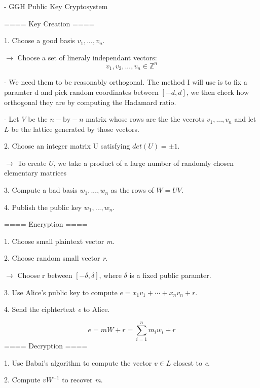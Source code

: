 \documentclass{article}
\begin{document}
- GGH Public Key Cryptosystem\newline

	==== Key Creation ====\newline

1. Choose a good basis $v_1, \text{...}, v_n$.

$\rightarrow$ Choose a set of lineraly independant vectors:
$$v_1, v_2, \text{...}, v_n \in \mathbb{Z}^n $$

- We need them to be reasonably orthogonal. The method I will use is to fix a paramter d and pick random coordinates between $[-d, d]$, we then check how orthogonal they are by computing the Hadamard ratio. 

- Let $V$ be the $n-\text{by}-n$ matrix whose rows are the the vecrots $v_1, \text{...}, v_n$ and let $L$ be the lattice generated by those vectors.

2. Choose an integer matrix U satisfying $det(U) = ±1$.

$\rightarrow$ To create $U$, we take a product of a large number of randomly chosen elementary matrices

3. Compute a bad basis $w_1, \text{...}, w_n$ as the rows of $W = UV$.

4. Publish the public key $w_1, \text{...}, w_n$.\newline


	==== Encryption ====\newline

1. Choose small plaintext vector \textit{m}.

2. Choose random small vector \textit{r}.

$\rightarrow$ Choose r between $[-\delta, \delta]$, where $\delta$ is a fixed public paramter.

3. Use Alice’s public key to compute $e = x_1v_1 + \text{···} + x_nv_n + r.$

4. Send the ciphtertext \textit{e} to Alice.\newline

$$ e = mW + r = \sum^{n}_{i=1}m_iw_i + r $$
	==== Decryption ====\newline

1. Use Babai’s algorithm to compute the vector $v \in L$ closest to \textit{e}.

2. Compute $vW^{-1}$ to recover \textit{m}.
\end{document}
